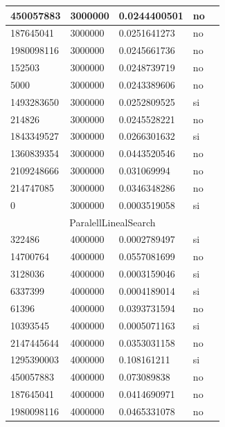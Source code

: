 \documentclass[12pt, fleqn]{article}                             %
\theoremstyle{break}                                            %
\begin{document}
\begin{longtable}{|m{5em}|m{5em}|m{10em}|m{5em}|@{}m{0pt}@{}}
            450057883& 3000000  & 0.0244400501 & no &\\[1em]    \hline
            187645041& 3000000  & 0.0251641273 & no &\\[1em]    \hline
            1980098116& 3000000  & 0.0245661736 & no &\\[1em]    \hline
            152503& 3000000  & 0.0248739719 & no &\\[1em]    \hline
            5000& 3000000  & 0.0243389606 & no &\\[1em]    \hline
            1493283650& 3000000  & 0.0252809525 & si &\\[1em]    \hline
            214826& 3000000  & 0.0245528221 & no &\\[1em]    \hline
            1843349527& 3000000  & 0.0266301632 & si &\\[1em]    \hline
            1360839354& 3000000  & 0.0443520546 & no &\\[1em]    \hline
            2109248666& 3000000  & 0.031069994 & no &\\[1em]    \hline
            214747085& 3000000  & 0.0346348286 & no &\\[1em]    \hline
            0& 3000000  & 0.0003519058 & si &\\[1em]    \hline
            \multicolumn{5}{|c|}{ParalellLinealSearch}   \\          \hline
            322486& 4000000  & 0.0002789497 & si &\\[1em]    \hline
            14700764& 4000000  & 0.0557081699 & no &\\[1em]    \hline
            3128036& 4000000  & 0.0003159046 & si &\\[1em]    \hline
            6337399& 4000000  & 0.0004189014 & si &\\[1em]    \hline
            61396& 4000000  & 0.0393731594 & no &\\[1em]    \hline
            10393545& 4000000  & 0.0005071163 & si &\\[1em]    \hline
            2147445644& 4000000  & 0.0353031158 & no &\\[1em]    \hline
            1295390003& 4000000  & 0.108161211 & si &\\[1em]    \hline
            450057883& 4000000  & 0.073089838 & no &\\[1em]    \hline
            187645041& 4000000  & 0.0414690971 & no &\\[1em]    \hline
            1980098116& 4000000  & 0.0465331078 & no &\\[1em]    \hline

\end{longtable}
\end{document}
